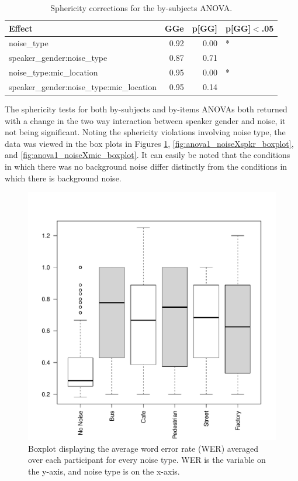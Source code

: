 \documentclass[dissertation,copyright]{uathesis}
\makeatletter
\def\maxwidth{ %
  \ifdim\Gin@nat@width>\linewidth
    \linewidth
  \else
    \Gin@nat@width
  \fi
}
\makeatother
\begin{document}
\begin{table}[ht]
\centering
\begin{tabular}{lrrl}
  \hline
Effect & GGe & p[GG] & p[GG]$<$.05 \\ 
  \hline
noise\_type & 0.92 & 0.00 & * \\ 
  speaker\_gender:noise\_type & 0.87 & 0.71 &  \\ 
  noise\_type:mic\_location & 0.95 & 0.00 & * \\ 
  speaker\_gender:noise\_type:mic\_location & 0.95 & 0.14 &  \\ 
   \hline
\end{tabular}
\caption{Sphericity corrections for the by-subjects ANOVA.} 
\label{tab:anova1_item_sph_corr}
\end{table}


The sphericity tests for both by-subjects and by-items ANOVAs both returned with a change in the two way interaction between speaker gender and noise, it not being significant.  Noting the sphericity violations involving noise type, the data was viewed in the box plots in Figures \ref{fig:anova1_noise_boxplot}, \ref{fig:anova1_noiseXspkr_boxplot}, and \ref{fig:anova1_noiseXmic_boxplot}.  It can easily be noted that the conditions in which there was no background noise differ distinctly from the conditions in which there is background noise.


\begin{figure}

\includegraphics[width=\maxwidth]{figure/boxplot_noise-1} 

\caption{Boxplot displaying the average word error rate (WER) averaged over each participant for every noise type. WER is the variable on the y-axis, and noise type is on the x-axis.}
\label{fig:anova1_noise_boxplot}
\end{figure}
\end{document}
